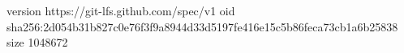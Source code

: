 version https://git-lfs.github.com/spec/v1
oid sha256:2d054b31b827c0e76f3f9a8944d33d5197fe416e15c5b86feca73cb1a6b25838
size 1048672
